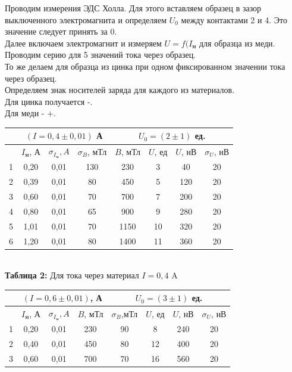 \documentclass[a4paper, 12pt]{article}%
\begin{document}
Проводим измерения ЭДС Холла. Для этого вставляем образец в зазор выключенного электромагнита и определяем $U_0$ между контактами 2 и 4. Это значение следует принять за 0. \\
Далее включаем электромагнит и измеряем $U = f(I_{\text{м}}$ для образца из меди.
\\
Проводим серию для 5 значений тока через образец.\\
То же делаем для образца из цинка при одном фиксированном значении тока через образец.\\
Определяем знак носителей заряда для каждого из материалов. \\
Для цинка получается -.\\
Для меди - +.\\
\begin{center}
\begin{tabular}{|c|c|c|c|c|c|c|c|}
\hline
 & \multicolumn{3}{c|}{$(I = 0,4 \pm 0,01)$ А} & \multicolumn{4}{c|}{$U_0 = (2 \pm 1)$ ед.} \\ \hline
 & $I_{\text{м}}$, А & $\sigma_{I_{\text{м}}}, A$ & $\sigma_B$, мТл & $B$, мТл & $U$, ед & $U$, нВ & $\sigma_{U}$, нВ \\ \hline
1 & 0,20 & 0,01 & 130 & 230 & 3 & 40 & 20 \\ \hline
2 & 0,39 & 0,01 & 80 & 450 & 5 & 120 & 20 \\ \hline
3 & 0,60 & 0,01 & 70 & 700 & 7 & 200 & 20 \\ \hline
4 & 0,80 & 0,01 & 65 & 900 & 9 & 280 & 20 \\ \hline
5 & 1,01 & 0,01 & 70 & 1150 & 10 & 320 & 20 \\ \hline
6 & 1,20 & 0,01 & 80 & 1400 & 11 & 360 & 20 \\ \hline
\end{tabular}\\
\textbf{Таблица 2:} Для тока через материал $I = 0,4$ A\\
\begin{tabular}{|c|c|c|c|c|c|c|c|}
\hline
 & \multicolumn{3}{c|}{$(I = 0,6 \pm 0,01)$, А} & \multicolumn{4}{c|}{$U_0 = (3 \pm 1)$ ед.} \\ \hline
 & $I_{\text{м}}$, А & $\sigma_{I_{\text{м}}}, A$ & $B$, мТл & $\sigma_B$,мТл & $U$, ед & $U$, нВ & $\sigma_{U}$, нВ \\ \hline
1 & 0,20 & 0,01 & 230 & 90 & 8 & 240 & 20 \\ \hline
2 & 0,40 & 0,01 & 450 & 80 & 12 & 400 & 20 \\ \hline
3 & 0,60 & 0,01 & 700 & 70 & 16 & 560 & 20 \\ \hline

\end{tabular}
\end{center}
\end{document}
